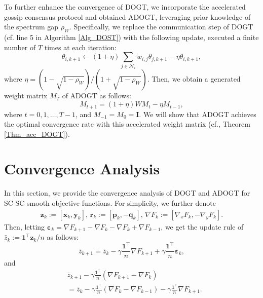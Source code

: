 \documentclass[10pt,a4paper]{amsart}
\begin{document}
To further enhance the convergence of DOGT, we incorporate the accelerated gossip consensus protocol \cite{liu2011accelerated} and obtained ADOGT, leveraging prior knowledge of the spectrum gap $\rho_W$. Specifically, we replace the communication step of DOGT (cf. line 5 in Algorithm \ref{Alg_DOST}) with the following update, executed a finite number of $T$ times at each iteration:
\begin{equation}\label{Eq_acc_consensus}
\theta _{i,k+1}\gets \left( 1+\eta \right) \sum_{j\in \mathcal{N} _i}{w_{i,j}\theta _{j,k+1}}-\eta \theta _{i,k+1},
\end{equation}
where $\eta =\left( 1-\sqrt{1-\rho _W} \right) /\left( 1+\sqrt{1-\rho _W} \right)$. Then, we obtain a generated weight matrix $M_T$ of ADOGT as follows:
\begin{equation}\label{Eq_weight_matrix_M}
M_{t+1}=\left( 1+\eta \right) WM_t-\eta M_{t-1},
\end{equation}
where $t=0,1,\dots,T-1$, and $M_{-1}=M_0=\mathbf{I}$. We will show that ADOGT achieves the optimal convergence rate with this accelerated weight matrix (cf., Theorem \ref{Thm_acc_DOGT}).


\section{Convergence Analysis}\label{Sec_convergence}

In this section, we provide the convergence analysis of DOGT and ADOGT for SC-SC smooth objective functions. For simplicity, we further denote
\begin{equation*}
\begin{aligned}
\mathbf{z}_k:=\left[ \mathbf{x}_k, \mathbf{y}_k \right] ,\,
\mathbf{r}_k:=\left[ \mathbf{p}_k, -\mathbf{q}_k \right],\,
\nabla F_k:=\left[ \nabla _xF_k, -\nabla _yF_k \right].
\end{aligned}
\end{equation*}
Then, letting $\boldsymbol{\varepsilon }_k=\nabla F_{k+1}-\nabla F_k-\nabla F_k+\nabla F_{k-1}$, we get the update rule of $\bar{z}_k:=\mathbf{1}^{\top}\mathbf{z}_k/n$ as follows:
\begin{equation}
\bar{z}_{k+1}=\bar{z}_k-\gamma \frac{\mathbf{1}^{\top}}{n}\nabla F_{k+1} +\gamma \frac{\mathbf{1}^{\top}}{n}\boldsymbol{\varepsilon }_k,
\end{equation}
and
\begin{equation}\label{Eq_update_z_ave}
\begin{aligned}
&\bar{z}_{k+1}-\gamma \frac{\mathbf{1}^{\top}}{n}\left( \nabla F_{k+1}-\nabla F_k \right) 
\\
&=\bar{z}_k-\gamma \frac{\mathbf{1}^{\top}}{n}\left( \nabla F_k-\nabla F_{k-1} \right) -\gamma \frac{\mathbf{1}^{\top}}{n}\nabla F_{k+1}.
\end{aligned}
\end{equation}
\end{document}
